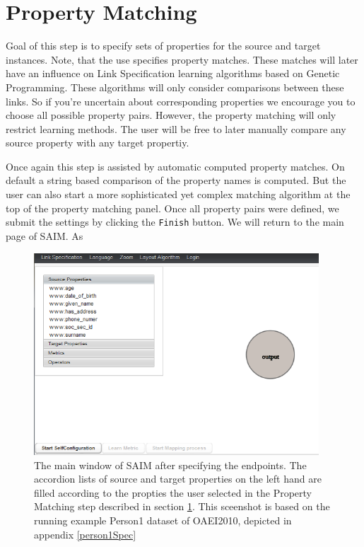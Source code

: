 \documentclass[oneside,a4paper,12pt]{memoir}
\begin{document}
	\section{Property Matching}
	\label{properties}
	Goal of this step is to specify sets of properties for the source and target instances. Note, that the use specifies property matches. These matches will later have an influence on Link Specification learning algorithms based on Genetic Programming. These algorithms will only consider comparisons between these links. So if you're uncertain about corresponding properties we encourage you to choose all possible property pairs. However, the property matching will only restrict learning methods. The user will be free to later manually compare any source property with any target propertiy.
	
	Once again this step is assisted by automatic computed property matches. On default a string based comparison of the property names is computed. But the user can also start a more sophisticated yet complex matching algorithm at the top of the property matching panel. Once all property pairs were defined, we submit the settings by clicking the \texttt{Finish} button. We will return to the main page of SAIM. As
	
 \begin{figure}[!h]
		\centering
		\includegraphics[width=0.95\textwidth]{images/metric_empty.png}
		\caption{The main window of SAIM after specifying the endpoints. The accordion lists of source and target properties on the left hand are filled according to the propties the user selected in the Property Matching step described in section \ref{properties}. This sceenshot is based on the running example Person1 dataset of OAEI2010, depicted in appendix \ref{person1Spec}}
		\label{fig:metric_start}
	\end{figure}
	
\end{document}
